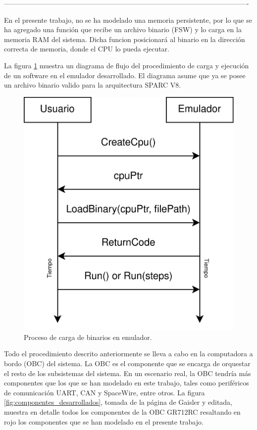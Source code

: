 ----------------------------------------------------------------------------------------------------------


En el presente trabajo, no se ha modelado una memoria persistente, por lo que se ha agregado una función que recibe un archivo binario (FSW) y lo carga en la memoria RAM del sistema. Dicha funcion posicionará al binario en la dirección correcta de memoria, donde el CPU lo pueda ejecutar.

La figura \ref{fig:carga_binario} muestra un diagrama de flujo del procedimiento de carga y ejecución de un software en el emulador desarrollado. El diagrama asume que ya se posee un archivo binario valido para la arquitectura SPARC V8.

\begin{figure}[htbp]
	\centering
	\includegraphics[width=.6\textwidth]{./Figures/carga_binario}
	\caption{Proceso de carga de binarios en emulador.}
	\label{fig:carga_binario}
\end{figure}

\newpage

Todo el procedimiento descrito anteriormente se lleva a cabo en la computadora a bordo (OBC) del sistema. La OBC es el componente que se encarga de orquestar el resto de los subsistemas del sistema. En un escenario real, la OBC tendría más componentes que los que se han modelado en este trabajo, tales como periféricos de comunicación UART, CAN y SpaceWire, entre otros. La figura \ref{fig:componentes_desarrollados}, tomada de la página de Gaisler \citep{GR712RC} y editada, muestra en detalle todos los componentes de la OBC GR712RC resaltando en rojo los componentes que se han modelado en el presente trabajo.


